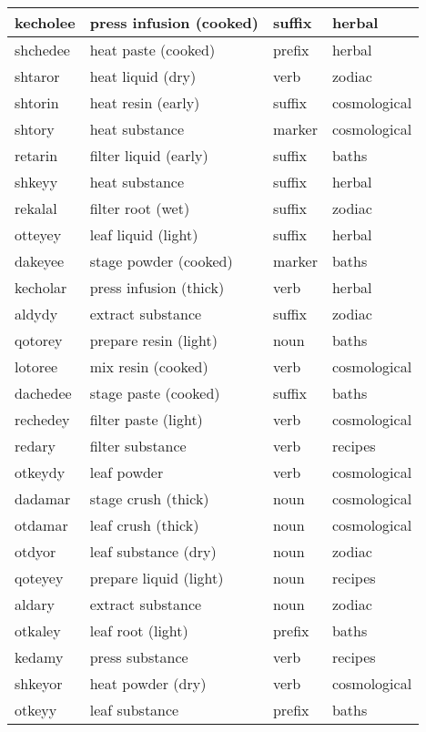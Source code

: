 \documentclass[12pt]{article}
\begin{document}
\begin{longtable}{|l|l|l|l|}
kecholee & press infusion (cooked) & suffix & herbal \\ \hline
shchedee & heat paste (cooked) & prefix & herbal \\ \hline
shtaror & heat liquid (dry) & verb & zodiac \\ \hline
shtorin & heat resin (early) & suffix & cosmological \\ \hline
shtory & heat substance & marker & cosmological \\ \hline
retarin & filter liquid (early) & suffix & baths \\ \hline
shkeyy & heat substance & suffix & herbal \\ \hline
rekalal & filter root (wet) & suffix & zodiac \\ \hline
otteyey & leaf liquid (light) & suffix & herbal \\ \hline
dakeyee & stage powder (cooked) & marker & baths \\ \hline
kecholar & press infusion (thick) & verb & herbal \\ \hline
aldydy & extract substance & suffix & zodiac \\ \hline
qotorey & prepare resin (light) & noun & baths \\ \hline
lotoree & mix resin (cooked) & verb & cosmological \\ \hline
dachedee & stage paste (cooked) & suffix & baths \\ \hline
rechedey & filter paste (light) & verb & cosmological \\ \hline
redary & filter substance & verb & recipes \\ \hline
otkeydy & leaf powder & verb & cosmological \\ \hline
dadamar & stage crush (thick) & noun & cosmological \\ \hline
otdamar & leaf crush (thick) & noun & cosmological \\ \hline
otdyor & leaf substance (dry) & noun & zodiac \\ \hline
qoteyey & prepare liquid (light) & noun & recipes \\ \hline
aldary & extract substance & noun & zodiac \\ \hline
otkaley & leaf root (light) & prefix & baths \\ \hline
kedamy & press substance & verb & recipes \\ \hline
shkeyor & heat powder (dry) & verb & cosmological \\ \hline
otkeyy & leaf substance & prefix & baths \\ \hline

\end{longtable}
\end{document}
